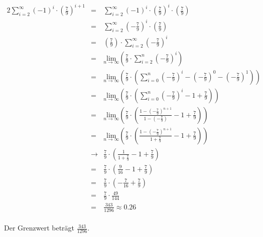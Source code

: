 \documentclass[10pt,a4paper,oneside,ngerman,numbers=noenddot]{scrartcl}
\begin{document}
\subsubsection{} %
\begin{alignat*}{2}
\sum\limits_{i=2}^{\infty} (-1)^{i} \cdot \left( \frac{7}{9} \right)^{i+1} &=& \sum\limits_{i=2}^{\infty} (-1)^{i} \cdot \left( \frac{7}{9} \right)^{i} \cdot \left( \frac{7}{9} \right) \\
&=& \sum\limits_{i=2}^{\infty} \left( -\frac{7}{9} \right)^{i} \cdot \left( \frac{7}{9} \right) \\
&=& \left( \frac{7}{9} \right) \cdot \sum\limits_{i=2}^{\infty} \left( -\frac{7}{9} \right)^{i} \\
&=& \underset{n \rightarrow \infty}{\text{lim}} \left( \frac{7}{9} \cdot \sum\limits_{i=2}^{n} \left( -\frac{7}{9} \right)^{i} \right) \\
&=& \underset{n \rightarrow \infty}{\text{lim}} \left( \frac{7}{9} \cdot \left( \sum\limits_{i=0}^{n} \left( -\frac{7}{9} \right)^{i} - \left( -\frac{7}{9} \right)^{0} - \left( -\frac{7}{9} \right)^{1} \right) \right) \\
&=& \underset{n \rightarrow \infty}{\text{lim}} \left( \frac{7}{9} \cdot \left( \sum\limits_{i=0}^{n} \left( -\frac{7}{9} \right)^{i} - 1 + \frac{7}{9} \right) \right) \\
&=& \underset{n \rightarrow \infty}{\text{lim}} \left( \frac{7}{9} \cdot \left( \frac{1- \left(-\frac{7}{9} \right)^{n+1}}{1 - \left(-\frac{7}{9} \right)} - 1 + \frac{7}{9} \right) \right) \\
&=& \underset{n \rightarrow \infty}{\text{lim}} \left( \frac{7}{9} \cdot \left( \frac{1- \left(-\frac{7}{9} \right)^{n+1}}{1 + \frac{7}{9}} - 1 + \frac{7}{9} \right) \right)\\
&\rightarrow & \frac{7}{9} \cdot \left( \frac{1}{1 + \frac{7}{9}} - 1 + \frac{7}{9} \right) \\
&=& \frac{7}{9} \cdot \left( \frac{9}{16} - 1 + \frac{7}{9} \right) \\
&=& \frac{7}{9} \cdot \left( -\frac{7}{16} + \frac{7}{9} \right) \\
&=& \frac{7}{9} \cdot \frac{49}{144} \\
&=& \frac{343}{1296} \approx 0.26
\end{alignat*}\\
Der Grenzwert beträgt $\frac{343}{1296}$.
\subsubsection{} %
\end{document}

